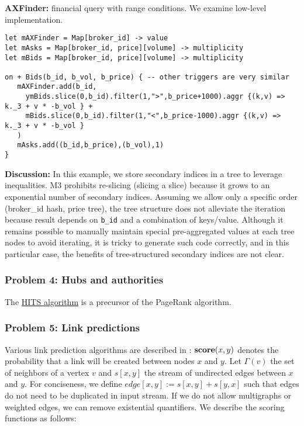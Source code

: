 \documentclass[11pt]{article}
\newlength{\dlen}
\def\discuss#1{\par\hspace{2em}
\setlength{\dlen}{\textwidth}
\addtolength{\dlen}{-2em}
\begin{minipage}{\dlen}\footnotesize {\bf\color{red} Discussion:} #1\end{minipage}\par}
\begin{document}
\textbf{AXFinder:} financial query with range conditions. We examine low-level implementation.
\begin{verbatim}
let mAXFinder = Map[broker_id] -> value
let mAsks = Map[broker_id, price][volume] -> multiplicity
let mBids = Map[broker_id, price][volume] -> multiplicity

on + Bids(b_id, b_vol, b_price) { -- other triggers are very similar
   mAXFinder.add(b_id, 
     ymBids.slice(0,b_id).filter(1,">",b_price+1000).aggr {(k,v) =>  k._3 + v * -b_vol } +
     mBids.slice(0,b_id).filter(1,"<",b_price-1000).aggr {(k,v) =>  k._3 + v * -b_vol }
   )
   mAsks.add((b_id,b_price),(b_vol),1)
}
\end{verbatim}
\discuss{In this example, we store secondary indices in a tree to leverage inequalities. M3 prohibits re-slicing (slicing a slice) because it grows to an exponential number of secondary indices. Assuming we allow only a specific order (broker\_id hash, price tree), the tree structure does not alleviate the iteration because result depends on {\tt b\_id} and a combination of keys/value. Although it remains possible to manually maintain special pre-aggregated values at each tree nodes to avoid iterating, it is tricky to generate such code correctly, and in this particular case, the benefits of tree-structured secondary indices are not clear.}


\subsubsection*{Problem 4: Hubs and authorities}
The \href{http://en.wikipedia.org/wiki/HITS_algorithm}{HITS algorithm} is a precursor of the PageRank algorithm.

\subsubsection*{Problem 5: Link predictions}
Various link prediction algorithms are described in \cite{linkpred}: ${\bf score}(x,y)$ denotes the probability that a link will be created between nodes $x$ and $y$. Let $\Gamma(v)$ the set of neighbors of a vertex $v$ and $s[x,y]$ the stream of undirected edges between $x$ and $y$. For conciseness, we define $edge[x,y] := s[x,y]+s[y,x]$ such that edges do not need to be duplicated in input stream. If we do not allow multigraphs or weighted edges, we can remove existential quantifiers. We describe the scoring functions as follows:
\end{document}
